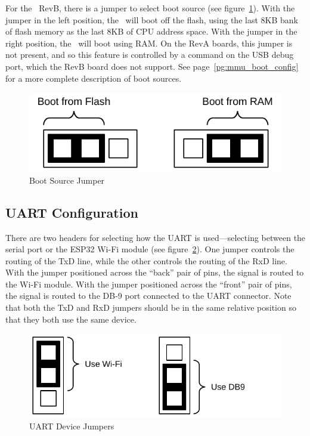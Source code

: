 For the \jr\ RevB, there is a jumper to select boot source (see figure~\ref{fig:jmp_boot}). With the jumper in the left position, the \jr\ will boot off the flash, using the last 8KB bank of flash memory as the last 8KB of CPU address space. With the jumper in the right position, the \jr\ will boot using RAM. On the RevA boards, this jumper is not present, and so this feature is controlled by a command on the USB debug port, which the RevB board does not support. See page~\ref{pg:mmu_boot_config} for a more complete description of boot sources.

\begin{figure}[ht]
    \begin{center}
        \includegraphics[scale=0.75]{images/jumper_boot.pdf}
    \end{center}
    \caption{Boot Source Jumper}
    \label{fig:jmp_boot}
\end{figure}

\subsection*{UART Configuration}

There are two headers for selecting how the UART is used---selecting between the serial port or the ESP32 Wi-Fi module (see figure~\ref{fig:jmp_uart}). One jumper controls the routing of the TxD line, while the other controls the routing of the RxD line. With the jumper positioned across the ``back'' pair of pins, the signal is routed to the Wi-Fi module. With the jumper positioned across the ``front'' pair of pins, the signal is routed to the DB-9 port connected to the UART connector. Note that both the TxD and RxD jumpers should be in the same relative position so that they both use the same device.

\begin{figure}[ht]
    \begin{center}
        \includegraphics[scale=0.75]{images/jumper_uart.pdf}
    \end{center}
    \caption{UART Device Jumpers}
    \label{fig:jmp_uart}
\end{figure}